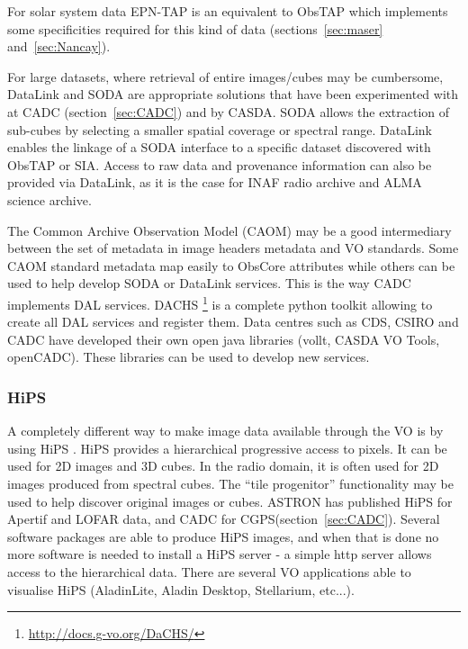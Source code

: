 \documentclass[11pt,a4paper]{ivoatex/ivoa}
\begin{document}
For solar system data EPN-TAP is an equivalent to ObsTAP which implements some specificities required for this kind of data (sections~\ref{sec:maser} and~\ref{sec:Nancay}). 

For large datasets, where retrieval of entire images/cubes may be cumbersome,  DataLink and SODA are 
appropriate solutions that have been experimented with at CADC (section~\ref{sec:CADC}) and by CASDA. 
SODA allows the extraction of sub-cubes by selecting a smaller spatial coverage or spectral range. 
DataLink enables the linkage of a SODA interface to a specific dataset discovered with ObsTAP or SIA. 
Access to raw data and provenance information can also be provided via DataLink, as it is the case for 
INAF radio archive and ALMA science archive.

The Common Archive Observation Model (CAOM) may be a good intermediary between the set of metadata in 
image headers metadata and VO standards. Some CAOM standard metadata map easily to ObsCore attributes 
while others can be used to help develop SODA or DataLink services. This is the way CADC implements DAL 
services. DACHS \footnote{\url{http://docs.g-vo.org/DaCHS/}} is a complete python toolkit allowing to 
create all DAL services and register them. Data centres such as CDS, CSIRO and CADC have developed their 
own open java libraries (vollt, CASDA VO Tools, openCADC). These libraries can be used to develop new 
services.


\subsubsection{HiPS}
A completely different way to make image data available through the VO is by using HiPS 
\citep{2017ivoa.spec.0519F}. HiPS provides a hierarchical progressive access to pixels. It can be used 
for 2D images and 3D cubes. In the radio domain, it is often used for 2D images produced from spectral 
cubes. The ``tile progenitor''  functionality may be used to help discover original images or cubes. 
ASTRON has published HiPS for Apertif and LOFAR data, and CADC for CGPS(section~\ref{sec:CADC}). Several 
software packages are able to produce HiPS images, and when that is done no more software is needed to 
install a HiPS server - a simple http server allows access to the hierarchical data. There are several 
VO applications able to visualise HiPS (AladinLite, Aladin Desktop, Stellarium, etc...). 
\end{document}

